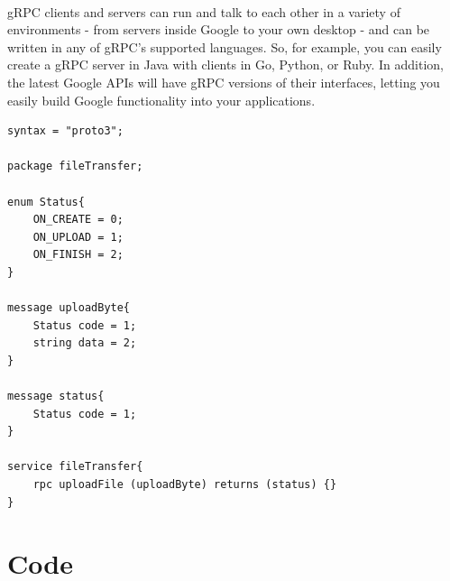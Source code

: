 \documentclass{article}
\begin{document}
\paragraph{}
gRPC clients and servers can run and talk to each other in a variety of environments - from servers inside Google to your own desktop - and can be written in any of gRPC’s supported languages. So, for example, you can easily create a gRPC server in Java with clients in Go, Python, or Ruby. In addition, the latest Google APIs will have gRPC versions of their interfaces, letting you easily build Google functionality into your applications.

\begin{lstlisting}[caption= file.proto ]
syntax = "proto3";

package fileTransfer;

enum Status{
    ON_CREATE = 0;
    ON_UPLOAD = 1;
    ON_FINISH = 2;
}

message uploadByte{
    Status code = 1;
    string data = 2;
}

message status{
    Status code = 1;
}

service fileTransfer{
    rpc uploadFile (uploadByte) returns (status) {}
}
\end{lstlisting}

\section{Code}
\end{document}
